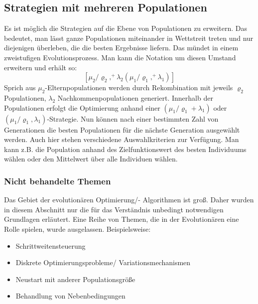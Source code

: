 \subsection{Strategien mit mehreren Populationen}
Es ist möglich die Strategien auf die Ebene von Populationen zu erweitern. Das bedeutet, man lässt ganze Populationen miteinander in Wettstreit treten und nur diejenigen überleben, die die besten Ergebnisse liefern. Das mündet in einem zweistufigen Evolutionsprozess. Man kann die Notation um diesen Umstand erweitern und erhält so:
%
$$
[\mu_2/\varrho_2,^{+}\lambda_2(\mu_1/\varrho_1,^{+}\lambda_1)]
$$
Sprich aus $\mu_2$-Elternpopulationen werden durch Rekombination mit jeweils $\varrho_2$ Populationen, $\lambda_2$ Nachkommenpopulationen generiert. Innerhalb der Populationen erfolgt die Optimierung anhand einer $({\mu_1}/{\varrho_1}+\lambda_1)$ oder $({\mu_1}/{\varrho_1},\lambda_1)$-Strategie. Nun können nach einer bestimmten Zahl von Generationen die besten Populationen für die nächste Generation ausgewählt werden. Auch hier stehen verschiedene Auswahlkriterien zur Verfügung. Man kann z.B. die Population anhand des Zielfunktionswert des besten Individuums wählen oder den Mittelwert über alle Individuen wählen.
%
\subsubsection{Nicht behandelte Themen}
%
Das Gebiet der evolutionären Optimierung/- Algorithmen ist groß. Daher wurden in diesem Abschnitt nur die für das Verständnis unbedingt notwendigen Grundlagen erläutert. Eine Reihe von Themen, die in der Evolutionären eine Rolle spielen, wurde ausgelassen. Beispielsweise:
%
\begin{itemize}[itemsep=0mm]
\item Schrittweitensteuerung
\item Diskrete Optimierungsprobleme/ Variationsmechanismen
\item Neustart mit anderer Populationsgröße
\item Behandlung von Nebenbedingungen
\end{itemize}
%